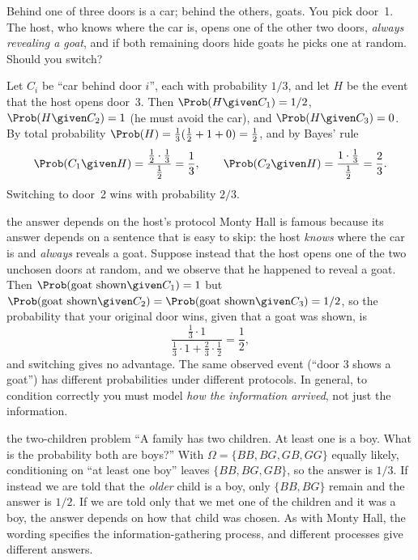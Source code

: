 \begin{example}\label{ex:monty}
Behind one of three doors is a car; behind the others, goats. You pick door~1.
The host, who knows where the car is, opens one of the other two doors,
\emph{always revealing a goat}, and if both remaining doors hide goats he picks
one at random. Should you switch?

Let $C_i$ be ``car behind door $i$'', each with probability $1/3$, and let $H$ be
the event that the host opens door~3. Then
$\Prob(H\given C_1)=1/2$, $\Prob(H\given C_2)=1$ (he must avoid the car), and
$\Prob(H\given C_3)=0$. By total probability $\Prob(H)=\frac13(\frac12+1+0)
=\frac12$, and by Bayes' rule
\[
\Prob(C_1\given H)=\frac{\frac12\cdot\frac13}{\frac12}=\frac13,\qquad
\Prob(C_2\given H)=\frac{1\cdot\frac13}{\frac12}=\frac23 .
\]
Switching to door~2 wins with probability $2/3$.
\end{example}

\begin{nuance}{the answer depends on the host's protocol}
Monty Hall is famous because its answer depends on a sentence that is easy to
skip: the host \emph{knows} where the car is and \emph{always} reveals a goat.
Suppose instead that the host opens one of the two unchosen doors at random, and
we observe that he happened to reveal a goat. Then
$\Prob(\text{goat shown}\given C_1)=1$ but
$\Prob(\text{goat shown}\given C_2)=\Prob(\text{goat shown}\given C_3)=1/2$,
so the probability that your original door wins, given that a goat was shown, is
\[
\frac{\frac13\cdot1}{\frac13\cdot1+\frac23\cdot\frac12}=\frac12,
\]
and switching gives no advantage. The same observed event (``door 3 shows a
goat'') has different probabilities under different protocols. In general, to
condition correctly you must model \emph{how the information arrived}, not just
the information.
\end{nuance}

\begin{nuance}{the two-children problem}
``A family has two children. At least one is a boy. What is the probability
both are boys?'' With $\Omega=\{BB,BG,GB,GG\}$ equally likely, conditioning on
``at least one boy'' leaves $\{BB,BG,GB\}$, so the answer is $1/3$. If instead we
are told that the \emph{older} child is a boy, only $\{BB,BG\}$ remain and the
answer is $1/2$. If we are told only that we met one of the children and it was
a boy, the answer depends on how that child was chosen. As with Monty Hall, the
wording specifies the information-gathering process, and different processes
give different answers.
\end{nuance}


